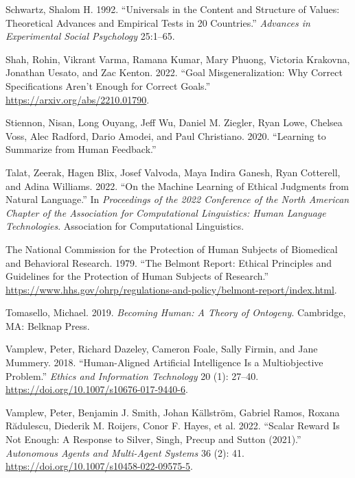 \documentclass[
  letterpaper,
  numbers=noenddot,
  DIV=11,
  oneside]{scrreprt}
\newlength{\cslhangindent}
\newenvironment{CSLReferences}[2] %
 {\begin{list}{}{%
  \setlength{\itemindent}{0pt}
  \setlength{\leftmargin}{0pt}
  \setlength{\parsep}{0pt}
  \ifodd #1
   \setlength{\leftmargin}{\cslhangindent}
   \setlength{\itemindent}{-1\cslhangindent}
  \fi
  \setlength{\itemsep}{#2\baselineskip}}}
 {\end{list}}
\theoremstyle{remark}
\begin{document}
\begin{CSLReferences}{1}{0}
Schwartz, Shalom H. 1992. {``Universals in the Content and Structure of
Values: Theoretical Advances and Empirical Tests in 20 Countries.''}
\emph{Advances in Experimental Social Psychology} 25:1--65.

Shah, Rohin, Vikrant Varma, Ramana Kumar, Mary Phuong, Victoria
Krakovna, Jonathan Uesato, and Zac Kenton. 2022. {``Goal
Misgeneralization: Why Correct Specifications Aren't Enough for Correct
Goals.''} \url{https://arxiv.org/abs/2210.01790}.

Stiennon, Nisan, Long Ouyang, Jeff Wu, Daniel M. Ziegler, Ryan Lowe,
Chelsea Voss, Alec Radford, Dario Amodei, and Paul Christiano. 2020.
{``Learning to Summarize from Human Feedback.''}

Talat, Zeerak, Hagen Blix, Josef Valvoda, Maya Indira Ganesh, Ryan
Cotterell, and Adina Williams. 2022. {``On the Machine Learning of
Ethical Judgments from Natural Language.''} In \emph{Proceedings of the
2022 {Conference} of the {North} {American} {Chapter} of the
{Association} for {Computational} {Linguistics}: {Human} {Language}
{Technologies}}. Association for Computational Linguistics.

The National Commission for the Protection of Human Subjects of
Biomedical and Behavioral Research. 1979. {``The Belmont Report: Ethical
Principles and Guidelines for the Protection of Human Subjects of
Research.''}
\url{https://www.hhs.gov/ohrp/regulations-and-policy/belmont-report/index.html}.

Tomasello, Michael. 2019. \emph{Becoming Human: {A} Theory of Ontogeny}.
Cambridge, MA: Belknap Press.

Vamplew, Peter, Richard Dazeley, Cameron Foale, Sally Firmin, and Jane
Mummery. 2018. {``Human-Aligned Artificial Intelligence Is a
Multiobjective Problem.''} \emph{Ethics and Information Technology} 20
(1): 27--40. \url{https://doi.org/10.1007/s10676-017-9440-6}.

Vamplew, Peter, Benjamin J. Smith, Johan Källström, Gabriel Ramos,
Roxana Rădulescu, Diederik M. Roijers, Conor F. Hayes, et al. 2022.
{``Scalar Reward Is Not Enough: A Response to {Silver}, {Singh},
{Precup} and {Sutton} (2021).''} \emph{Autonomous Agents and Multi-Agent
Systems} 36 (2): 41. \url{https://doi.org/10.1007/s10458-022-09575-5}.


\end{CSLReferences}
\end{document}
